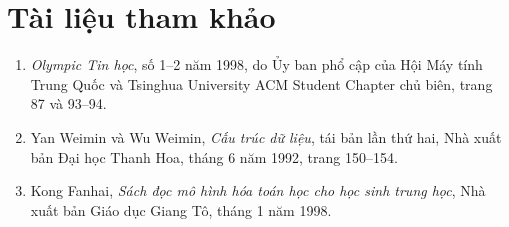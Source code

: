 \documentclass[11pt]{article}
\begin{document}
\section*{Tài liệu tham khảo}

\begin{enumerate}
  \item \emph{Olympic Tin học}, số 1--2 năm 1998, do Ủy ban phổ cập của Hội
  Máy tính Trung Quốc và Tsinghua University ACM Student Chapter chủ biên,
  trang 87 và 93--94.

  \item Yan Weimin và Wu Weimin, \emph{Cấu trúc dữ liệu}, tái bản lần thứ hai,
  Nhà xuất bản Đại học Thanh Hoa, tháng 6 năm 1992, trang 150--154.

  \item Kong Fanhai, \emph{Sách đọc mô hình hóa toán học cho học sinh trung
  học}, Nhà xuất bản Giáo dục Giang Tô, tháng 1 năm 1998.
\end{enumerate}
\end{document}
